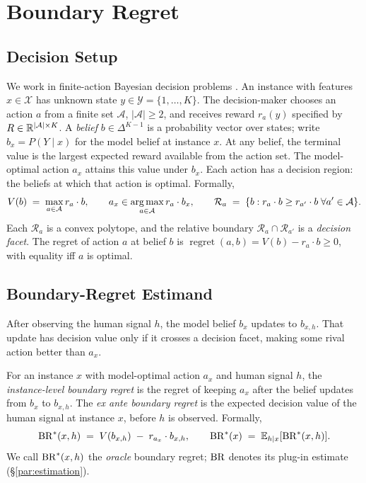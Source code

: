 \section{Boundary Regret}
\label{sec:methodology}

\subsection{Decision Setup}
We work in finite-action Bayesian decision problems \citep{DeGroot1970,Howard1966}.
An instance with features $x \in \mathcal{X}$ has unknown state $y \in \mathcal{Y} = \{1,\ldots,K\}$.
The decision-maker chooses an action $a$ from a finite set $\mathcal{A}$, $|\mathcal{A}| \geq 2$, and receives reward $r_a(y)$ specified by $R \in \mathbb{R}^{|\mathcal{A}| \times K}$.
A \emph{belief} $b \in \Delta^{K-1}$ is a probability vector over states; write $b_x = P(Y \mid x)$ for the model belief at instance $x$.
At any belief, the terminal value is the largest expected reward available from the action set.
The model-optimal action $a_x$ attains this value under $b_x$.
Each action has a decision region: the beliefs at which that action is optimal.
Formally,
\begin{equation}
    V(b) \;=\; \max_{a \in \mathcal{A}} r_a \cdot b,
    \qquad
    a_x \in \operatorname*{arg\,max}_{a \in \mathcal{A}} r_a \cdot b_x,
    \qquad
    \mathcal{R}_a
    \;=\;
    \{b : r_a \cdot b \geq r_{a'} \cdot b\;\forall a' \in \mathcal{A}\}.
\label{eq:decision-setup}
\end{equation}
Each $\mathcal{R}_a$ is a convex polytope, and the relative boundary $\mathcal{R}_a \cap \mathcal{R}_{a'}$ is a \emph{decision facet}.
The regret of action $a$ at belief $b$ is $\operatorname{regret}(a, b) = V(b) - r_a \cdot b \geq 0$, with equality iff $a$ is optimal.

\subsection{Boundary-Regret Estimand}
After observing the human signal $h$, the model belief $b_x$ updates to $b_{x,h}$.
That update has decision value only if it crosses a decision facet, making some rival action better than $a_x$.

\begin{definition}\label{def:br-instance}
For an instance $x$ with model-optimal action $a_x$ and human signal $h$, the \emph{instance-level boundary regret} is the regret of keeping $a_x$ after the belief updates from $b_x$ to $b_{x,h}$.
The \emph{ex ante boundary regret} is the expected decision value of the human signal at instance $x$, before $h$ is observed.
Formally,
\begin{equation}
    \operatorname{BR}^{*}(x, h) \;=\; V(b_{x,h}) \;-\; r_{a_x} \cdot b_{x,h},
    \qquad
    \operatorname{BR}^{*}(x) \;=\; \mathbb{E}_{h \mid x}[\operatorname{BR}^{*}(x, h)].
\label{eq:boundary-regret}
\end{equation}
We call $\operatorname{BR}^{*}(x,h)$ the \emph{oracle} boundary regret; $\operatorname{BR}$ denotes its plug-in estimate (\S\ref{par:estimation}).
\end{definition}

